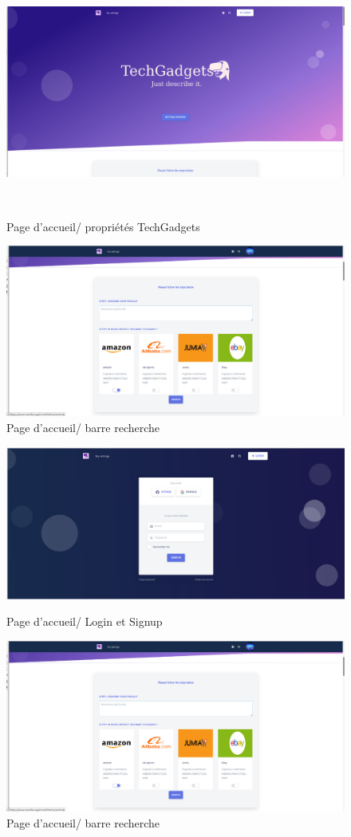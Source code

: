 \begin{figure}[h]
    \centering
\includegraphics[scale=.4]{pics/screens/1.png}
\caption{Page d'accueil/ propriétés TechGadgets}
\\


\end{figure}
\vfill
\begin{figure}[h]
    \centering
\includegraphics[scale=.4]{pics/screens/2.png}
\caption{Page d'accueil/ barre recherche}
\end{figure}
\begin{figure}[!T]
   \centering
\includegraphics[scale=.4]{pics/screens/4.png}
\caption{Page d'accueil/ Login et Signup}
\includegraphics[scale=.4]{pics/screens/2.png}
\caption{Page d'accueil/ barre recherche}
\end{figure}
